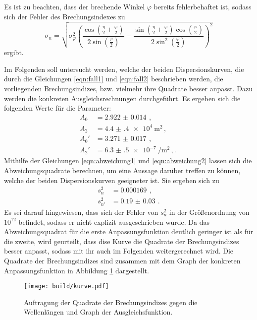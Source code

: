 Es ist zu beachten, dass
der brechende Winkel $\varphi$ bereits fehlerbehaftet ist, sodass sich der Fehler
des Brechungsindexes zu
\begin{equation*}
  \sigma_n = \sqrt{
   \sigma_{\varphi}^{2} \left(\frac{\cos{\left (\frac{\eta}{2} + \frac{\varphi}{2} \right )}}{2 \sin{\left (\frac{\varphi}{2} \right )}} - \frac{\sin{\left (\frac{\eta}{2}
  + \frac{\varphi}{2} \right )} \cos{\left (\frac{\varphi}{2} \right )}}{2 \sin^{2}{\left (\frac{\varphi}{2} \right )}}\right)^{2}}
\end{equation*}
ergibt.

Im Folgenden soll untersucht werden, welche der beiden Dispersionskurven, die durch die
Gleichungen \eqref{eqn:fall1} und \eqref{eqn:fall2} beschrieben werden, die vorliegenden
Brechungsindizes, bzw. vielmehr ihre Quadrate besser anpasst. Dazu werden die konkreten
Ausgleichsrechnungen durchgeführt. Es ergeben sich die folgenden Werte für die Parameter:
\begin{align*}
  A_0 &= \SI{2.922(14)}{}\,,\\
  A_2 &= \SI{4.4(4)e4}{\meter\squared}\,,\\
  A_0' &= \SI{3.271(17)}{}\,,\\
  A_2' &= \SI{6.3(5)e-7}{\per\meter\squared}\,,.\
\end{align*}
Mithilfe der Gleichungen \eqref{eqn:abweichung1} und \eqref{eqn:abweichung2} lassen sich die Abweichungsquadrate
berechnen, um eine Aussage darüber treffen zu können, welche der beiden Dispersionskurven
geeigneter ist. Sie ergeben sich zu
\begin{align*}
  s_n^2 &= \SI{0.000169}{}\,,\\
  s_{n'}^2 &= \SI{0.19(3)}{}\,.
\end{align*}
Es sei darauf hingewiesen, dass sich der Fehler von $s_n^2$ in der Größenordnung
von $10^{12}$ befindet, sodass er nicht explizit ausgeschrieben wurde.
Da das Abweichungsquadrat für die erste Anpassungsfunktion deutlich geringer ist als für
die zweite, wird geurteilt, dass dise Kurve die Quadrate der Brechungsindizes besser anpasst,
sodass mit ihr auch im Folgenden weitergerechnet wird.
Die Quadrate der Brechungsindizes sind zusammen mit dem Graph der konkreten Anpassungsfunktion
in Abbildung \ref{fig:kurve} dargestellt.

\begin{figure}[htp]
  \centering
  \texttt{[image: build/kurve.pdf]}
  \caption{Auftragung der Quadrate der Brechungsindizes gegen die Wellenlängen und Graph der Ausgleichsfunktion.}
  \label{fig:kurve}
\end{figure}

